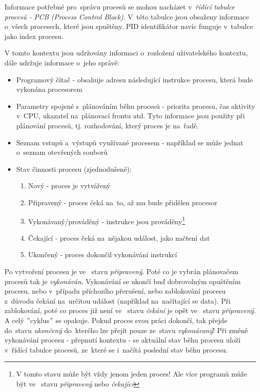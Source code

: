 Informace potřebné pro~správu procesů se mohou nacházet v~\emph{řídící tabulce procesů - PCB (Process Control Block)}. V~této tabulce jsou obsaženy informace o~všech procesech, které jsou spuštěny. PID identifikátor navíc funguje v~tabulce jako index procesu. 

\vspace{0,5cm}

V tomto kontextu jsou udržovány informaci o~rozložení uživatelského kontextu, dále udržuje informace o~jeho správě:
\begin{itemize}
    \item Programový čítač - obsahuje adresu následující instrukce procesu, která bude vykonána procesorem
    \item Parametry spojené s~plánováním běhu procesů - priorita procesu, čas aktivity v~CPU, ukazatel na~plánovací frontu atd. Tyto informace jsou použity při plánování procesů, tj. rozhodování, který proces je na~řadě. 
    \item Seznam vstupů a~výstupů využívané procesem - například se může jednat o~seznam otevřených souborů
    
    \clearpage
    
    \item Stav činnosti procesu (zjednodušeně):
    \begin{enumerate}
        \item Nový - proces je vytvářený
        \item Připravený - proces čeká na~to, až mu bude přidělen procesor
        \item Vykonávaný/prováděný - instrukce jsou prováděny\footnote{V tomto stavu může být vždy jenom jeden proces! Ale více programů může být ve~ stavu \emph{připravený} nebo \emph{čekající}}
        \item Čekající - proces čeká na~nějakou událost, jako načtení dat
        \item Ukončený - proces dokončil vykonávání instrukcí
    \end{enumerate}
\end{itemize}

Po vytvoření procesu je ve~ stavu \emph{připravený}. Poté co je vybrán plánovačem procesů tak je \emph{vykonáván}. Vykonávání se ukončí buď dobrovolným opuštěním procesu, nebo v~případu příchozího přerušení, nebo zablokování procesu z~důvodu čekání na~určitou událost (například na~načítající se data). Při zablokování, poté co proces již není ve~ stavu \emph{čekání} je opět ve~ stavu \emph{připravený}. A celý $"$cyklus$"$ se opakuje. Pokud proces svou práci dokončí, tak přejde do~stavu \emph{ukončený} do~kterého lze přejít pouze ze~stavu \emph{vykonávaný}! Při změně vykonávání procesu - přepnutí kontextu - se aktuální stav běhu procesu uloží v~řídící tabulce procesů, ze~které se i~načítá poslední stav běhu procesu.

